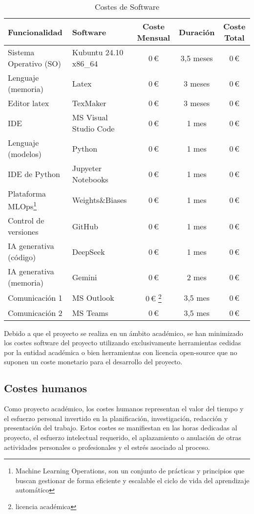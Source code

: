 \begin{table}[H]
\centering
\begin{tabular}{llccc}
\toprule
Funcionalidad & Software & Coste Mensual & Duración & Coste Total \\
\midrule
Sistema Operativo (SO) & Kubuntu 24.10 x86\_64  & 0\,€  & 3,5 meses & 0\,€ \\
Lenguaje (memoria) & Latex &  0\,€ & 3 meses & 0\,€ \\
Editor latex & TexMaker & 0\,€ & 3 meses & 0\,€ \\
IDE  & MS Visual Studio Code & 0\,€ & 1 mes & 0\,€ \\
Lenguaje (modelos) & Python & 0\,€ & 1 mes & 0\,€ \\
IDE de Python & Jupyeter Notebooks & 0\,€ & 1 mes & 0\,€ \\
Plataforma MLOps\footnote{Machine Learning Operations, son un conjunto de prácticas y principios que buscan gestionar de forma eficiente y escalable el ciclo de vida del aprendizaje automático} & Weights\&Biases & 0\,€ & 1 mes & 0\,€ \\
Control de versiones & GitHub & 0\,€ & 1 mes & 0\,€ \\
IA generativa (código) & DeepSeek & 0\,€ & 1 mes & 0\,€ \\
IA generativa (memoria) & Gemini & 0\,€ & 2 mes & 0\,€ \\
Comunicación 1 & MS Outlook & 0\,€ \footnote{licencia académica} & 3,5 mes & 0\,€ \\
Comunicación 2 & MS Teams & 0\,€ & 3,5 mes & 0\,€ \\
\bottomrule
\end{tabular}
\caption{Costes de Software}
\label{tab:costes_software}
\end{table}

Debido a que el proyecto se realiza en un ámbito académico, se han minimizado los costes software del proyecto utilizando exclusivamente herramientas cedidas por la entidad académica o bien herramientas con licencia open-source que no suponen un coste monetario para el desarrollo del proyecto.


\subsection{Costes humanos}
Como proyecto académico, los costes humanos representan el valor del tiempo y el esfuerzo personal invertido en la planificación, investigación, redacción y presentación del trabajo. Estos costes se manifiestan en las horas dedicadas al proyecto, el esfuerzo intelectual requerido, el aplazamiento o anulación de otras actividades personales o profesionales y el estrés asociado al proceso.

